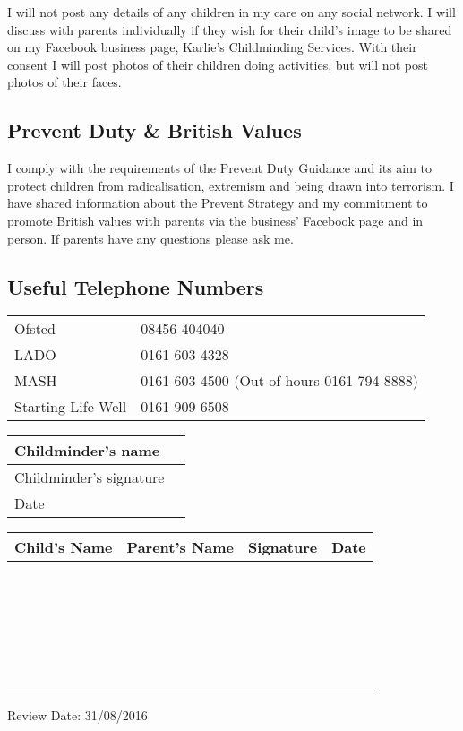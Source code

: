 I will not post any details of any children in my care on any
social network. I will discuss with parents individually if they wish 
for their child's image to be shared on my Facebook business page, Karlie's 
Childminding Services. With their consent I will post photos of their children
doing activities, but will not post photos of their faces. 

\subsection{Prevent Duty & British Values}

I comply with the requirements of the Prevent Duty Guidance and its aim to
protect children from radicalisation, extremism and being drawn into terrorism.
I have shared information about the Prevent Strategy and my commitment to 
promote British values with parents via the business' Facebook page and in person. 
If parents have any questions please ask me.

\subsection{Useful Telephone Numbers}

\begin{table}[h]
  \begin{tabularx}{\textwidth}{lX}
    Ofsted & 08456 404040 \\
    LADO & 0161 603 4328 \\
    MASH & 0161 603 4500 (Out of hours 0161 794 8888) \\
    Starting Life Well & 0161 909 6508 \\ 
 \end{tabularx}
\end{table}

\begin{table}[h]
  \def\arraystretch{2.0}
  \begin{tabularx}{\textwidth}{|l|X|}
    \hline
    Childminder's name & \\
    \hline
    Childminder's signature &  \\
    \hline
    Date & \\
    \hline
  \end{tabularx}
\end{table}

\begin{table}[H]
  \def\arraystretch{2.0}
  \begin{tabularx}{\textwidth}{|X|X|X|X|}
    \hline
    Child's Name & Parent's Name & Signature & Date \\
    \hline
    ~ & ~ & ~ & \\
    \hline
    ~ & ~ & ~ & \\
    \hline
    ~ & ~ & ~ & \\
    \hline
    ~ & ~ & ~ & \\
    \hline
    ~ & ~ & ~ & \\
    \hline
  \end{tabularx}
\end{table}

Review Date: 31/08/2016


